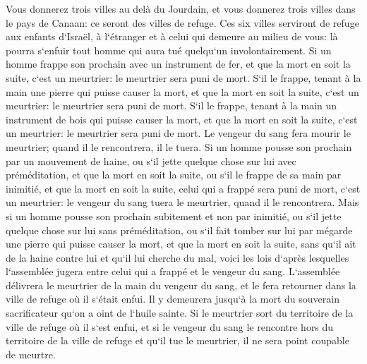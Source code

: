 \verse Vous donnerez trois villes au delà du Jourdain, et vous donnerez trois villes dans le pays de Canaan: ce seront des villes de refuge. 
\verse Ces six villes serviront de refuge aux enfants d`Israël, à l`étranger et à celui qui demeure au milieu de vous: là pourra s`enfuir tout homme qui aura tué quelqu`un involontairement. 
\verse Si un homme frappe son prochain avec un instrument de fer, et que la mort en soit la suite, c`est un meurtrier: le meurtrier sera puni de mort. 
\verse S`il le frappe, tenant à la main une pierre qui puisse causer la mort, et que la mort en soit la suite, c`est un meurtrier: le meurtrier sera puni de mort. 
\verse S`il le frappe, tenant à la main un instrument de bois qui puisse causer la mort, et que la mort en soit la suite, c`est un meurtrier: le meurtrier sera puni de mort. 
\verse Le vengeur du sang fera mourir le meurtrier; quand il le rencontrera, il le tuera. 
\verse Si un homme pousse son prochain par un mouvement de haine, ou s`il jette quelque chose sur lui avec préméditation, et que la mort en soit la suite, 
\verse ou s`il le frappe de sa main par inimitié, et que la mort en soit la suite, celui qui a frappé sera puni de mort, c`est un meurtrier: le vengeur du sang tuera le meurtrier, quand il le rencontrera. 
\verse Mais si un homme pousse son prochain subitement et non par inimitié, ou s`il jette quelque chose sur lui sans préméditation, 
\verse ou s`il fait tomber sur lui par mégarde une pierre qui puisse causer la mort, et que la mort en soit la suite, sans qu`il ait de la haine contre lui et qu`il lui cherche du mal, 
\verse voici les lois d`après lesquelles l`assemblée jugera entre celui qui a frappé et le vengeur du sang. 
\verse L`assemblée délivrera le meurtrier de la main du vengeur du sang, et le fera retourner dans la ville de refuge où il s`était enfui. Il y demeurera jusqu`à la mort du souverain sacrificateur qu`on a oint de l`huile sainte. 
\verse Si le meurtrier sort du territoire de la ville de refuge où il s`est enfui, 
\verse et si le vengeur du sang le rencontre hors du territoire de la ville de refuge et qu`il tue le meurtrier, il ne sera point coupable de meurtre. 
